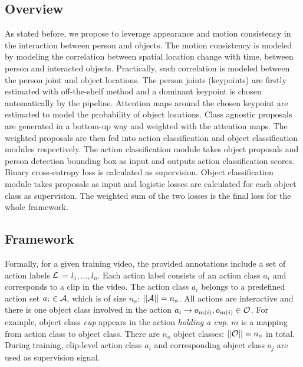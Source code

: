 \subsection{Overview}
As stated before, we propose to leverage appearance and motion consistency in the interaction between person and objects. The motion consistency is modeled by modeling the correlation between spatial location change with time, between person and interacted objects. Practically, such correlation is modeled between the person joint and object locations. The person joints (keypoints) are firstly estimated with off-the-shelf method and a dominant keypoint is chosen automatically by the pipeline. Attention maps around the chosen keypoint are estimated to model the probability of object locations. Class agnostic proposals are generated in a bottom-up way and weighted with the attention maps. The weighted proposals are then fed into action classification and object classification modules respectively. The action classification module takes object proposals and person detection bounding box as input and outputs action classification scores. Binary cross-entropy loss is calculated as supervision. Object classification module takes proposals as input and logistic losses are calculated for each object class as supervision. The weighted sum of the two losses is the final loss for the whole framework. 

\subsection{Framework}

Formally, for a given training video, the provided annotations include a set of action labels ${\mathcal L}$ = {$l_1,...,l_n$}. Each action label consists of an action class $a_i$ and corresponds to a clip in the video. The action class $a_i$ belongs to a predefined action set $a_i \in {\mathcal A}$, which is of size $n_{a}$: $||{\mathcal A}||=n_{a}$. All actions are interactive and there is one object class involved in the action $a_i\rightarrow o_{m(i)}, o_{m(i)}\in {\mathcal O}$. For example, object class \textit{cup} appears in the action \textit{holding a cup}. $m$ is a mapping from action class to object class. There are $n_{o}$ object classes: $||{\mathcal O}||=n_{o}$ in total. During training, clip-level action class $a_i$ and corresponding object class $o_j$ are used as supervision signal.

